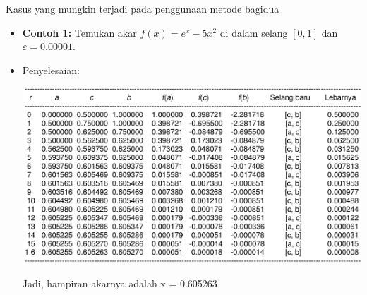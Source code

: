 \documentclass[pdflatex,compress]{beamer}
\begin{document}
\begin{frame}
	Kasus yang mungkin terjadi pada penggunaan metode bagidua
	\begin{itemize}
		\item \textbf{Contoh 1:} Temukan akar $ f(x) = e^x - 5x^2 $ di dalam selang $ [0, 1] $ dan $ \varepsilon = 0.00001 $.
		\item Penyelesaian:
		\begin{center}
			\includegraphics[width=0.7\linewidth]{img/img07.png}
		\end{center}
		Jadi, hampiran akarnya adalah x = 0.605263
	\end{itemize}
\end{frame}
\end{document}
